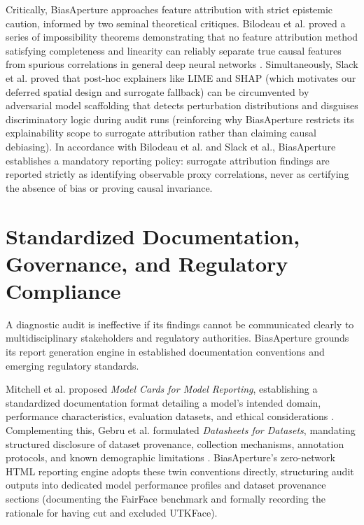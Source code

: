Critically, BiasAperture approaches feature attribution with strict epistemic caution, informed by two seminal theoretical critiques. Bilodeau et al. proved a series of impossibility theorems demonstrating that no feature attribution method satisfying completeness and linearity can reliably separate true causal features from spurious correlations in general deep neural networks \cite{bilodeau2022impossibility}. Simultaneously, Slack et al. proved that post-hoc explainers like LIME and SHAP (which motivates our deferred spatial design and surrogate fallback) can be circumvented by adversarial model scaffolding that detects perturbation distributions and disguises discriminatory logic during audit runs \cite{slack2020fooling} (reinforcing why BiasAperture restricts its explainability scope to surrogate attribution rather than claiming causal debiasing). In accordance with Bilodeau et al. and Slack et al., BiasAperture establishes a mandatory reporting policy: surrogate attribution findings are reported strictly as identifying observable proxy correlations, never as certifying the absence of bias or proving causal invariance.


\section{Standardized Documentation, Governance, and Regulatory Compliance}
\label{sec:lit_governance}

A diagnostic audit is ineffective if its findings cannot be communicated clearly to multidisciplinary stakeholders and regulatory authorities. BiasAperture grounds its report generation engine in established documentation conventions and emerging regulatory standards.

Mitchell et al. proposed \emph{Model Cards for Model Reporting}, establishing a standardized documentation format detailing a model's intended domain, performance characteristics, evaluation datasets, and ethical considerations \cite{mitchell2019modelcards}. Complementing this, Gebru et al. formulated \emph{Datasheets for Datasets}, mandating structured disclosure of dataset provenance, collection mechanisms, annotation protocols, and known demographic limitations \cite{gebru2018datasheets}. BiasAperture's zero-network HTML reporting engine adopts these twin conventions directly, structuring audit outputs into dedicated model performance profiles and dataset provenance sections (documenting the FairFace benchmark and formally recording the rationale for having cut and excluded UTKFace).

